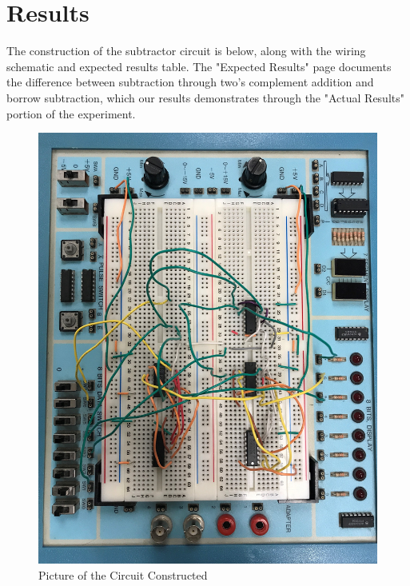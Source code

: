 \documentclass[11pt]{article}
\begin{document}
\section*{Results}

The construction of the subtractor circuit is below, along with the wiring schematic and expected results table. The "Expected Results" page documents the difference between subtraction through two's complement addition and borrow subtraction, which our results demonstrates through the "Actual Results" portion of the experiment.
\clearpage
\begin{figure}
	\includegraphics[width=1.0\textwidth]{"Circuit Picture"}
	\caption{Picture of the Circuit Constructed}
\end{figure}
\clearpage
\end{document}
